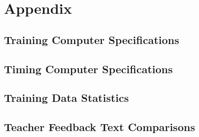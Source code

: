 \section{Appendix}

\subsection{Training Computer Specifications}

\subsection{Timing Computer Specifications}\label{sec:time_stats}

\subsection{Training Data Statistics}\label{sec:B_stats}

\subsection{Teacher Feedback Text Comparisons}
\label{subsec:teacher_feedback_text_comparisons}

